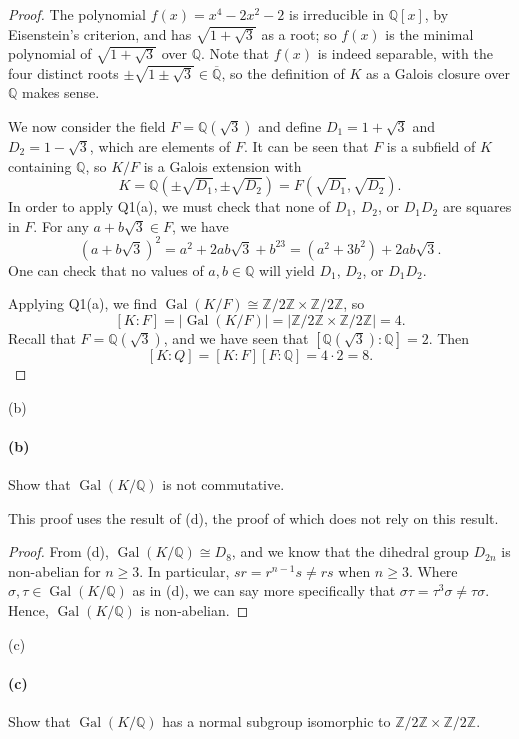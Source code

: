 \documentclass[12pt]{article}
\newenvironment{fullbox}{\begin{lrbox}{\savefullbox}\begin{minipage}{\dimexpr\textwidth-2\fboxsep\relax}}{\end{minipage}\end{lrbox}\begin{center}\framebox[\textwidth]{\usebox{\savefullbox}}\end{center}}
\newenvironment{pbox}[1][]{\begin{fullbox}\ifx#1\empty\else\paragraph{#1}\fi}{\end{fullbox}}
\theoremstyle{definition}
\newcommand{\Z}{\mathbb{Z}}
\newcommand{\Q}{\mathbb{Q}}
\newcommand{\<}{\langle}
\renewcommand{\>}{\rangle}
\newcommand{\isom}{\cong}
\newcommand{\clo}{\overline}
\DeclareMathOperator{\Gal}{Gal}
\begin{document}
\begin{proof}
    The polynomial $f(x) = x^4 - 2x^2 - 2$ is irreducible in $\Q[x]$, by Eisenstein's criterion, and has $\sqrt{1 + \sqrt{3}}$ as a root; so $f(x)$ is the minimal polynomial of $\sqrt{1 + \sqrt{3}}$ over $\Q$. Note that $f(x)$ is indeed separable, with the four distinct roots $\pm\sqrt{1 \pm \sqrt{3}} \in \clo{\Q}$, so the definition of $K$ as a Galois closure over $\Q$ makes sense. 
    
    We now consider the field $F = \Q(\sqrt{3})$ and define $D_1 = 1 + \sqrt{3}$ and $D_2 = 1 - \sqrt{3}$, which are elements of $F$. It can be seen that $F$ is a subfield of $K$ containing $\Q$, so $K/F$ is a Galois extension with
    \[
        K = \Q(\pm\sqrt{D_1}, \pm\sqrt{D_2}) = F(\sqrt{D_1}, \sqrt{D_2}).
    \]
    In order to apply Q1(a), we must check that none of $D_1$, $D_2$, or $D_1D_2$ are squares in $F$. For any $a + b\sqrt{3} \in F$, we have
    \[
        (a + b\sqrt{3})^2 = a^2 + 2ab\sqrt{3} + b^23 = (a^2 + 3b^2) + 2ab\sqrt{3}.
    \]
    One can check that no values of $a, b \in \Q$ will yield $D_1$, $D_2$, or $D_1D_2$.

    Applying Q1(a), we find $\Gal(K/F) \isom \Z/2\Z \times \Z/2\Z$, so
    \[
        [K : F] = |\Gal(K/F)| = |\Z/2\Z \times \Z/2\Z| = 4.
    \]
    Recall that $F = \Q(\sqrt{3})$, and we have seen that $[\Q(\sqrt{3}) : \Q] = 2$. Then
    \[
        [K : Q] = [K : F][F : \Q] = 4 \cdot 2 = 8.
    \]

    
\end{proof}

\begin{pbox}[(b)]
    Show that $\Gal(K/\Q)$ is not commutative.
\end{pbox}

This proof uses the result of (d), the proof of which does not rely on this result.

\begin{proof}
    From (d), $\Gal(K/\Q) \isom D_8$, and we know that the dihedral group $D_{2n}$ is non-abelian for $n \geq 3$. In particular, $sr = r^{n-1}s \ne rs$ when $n \geq 3$. Where $\sigma, \tau \in \Gal(K/\Q)$ as in (d), we can say more specifically that $\sigma\tau = \tau^3\sigma \ne \tau\sigma$. Hence, $\Gal(K/\Q)$ is non-abelian.

\end{proof}

\begin{pbox}[(c)]
    Show that $\Gal(K/\Q)$ has a normal subgroup isomorphic to $\Z/2\Z \times \Z/2\Z$.
\end{pbox}
\end{document}
